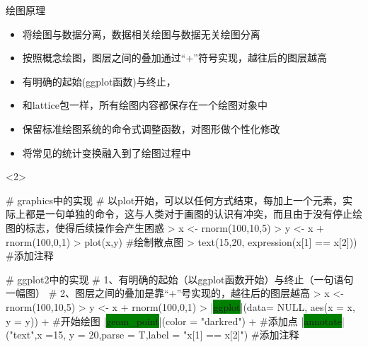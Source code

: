 \begin{frame}[t,fragile]{\subsecname}{绘图原理}
\begin{itemize}
\item<1-> 将绘图与数据分离，数据相关绘图与数据无关绘图分离
\item<2-> 按照概念绘图，图层之间的叠加通过“+”符号实现，越往后的图层越高
\item<2-> 有明确的起始(ggplot函数)与终止，
\item<3-> 和lattice包一样，所有绘图内容都保存在一个绘图对象中
\item<4-> 保留标准绘图系统的命令式调整函数，对图形做个性化修改
\item<4-> 将常见的统计变换融入到了绘图过程中
\end{itemize}

\begin{overlayarea}{\textwidth}{\textheight}
\begin{onlyenv}<2>
\begin{minipage}{\textwidth}
\begin{rcode}
# graphics中的实现
# 以plot开始，可以以任何方式结束，每加上一个元素，实际上都是一句单独的命令，这与人类对于画图的认识有冲突，而且由于没有停止绘图的标志，使得后续操作会产生困惑
> x <- rnorm(100,10,5)
> y <- x + rnorm(100,0,1)
> plot(x,y)   #绘制散点图
> text(15,20, expression(x[1] == x[2])) #添加注释
\end{rcode} 
\end{minipage}

\begin{minipage}{\textwidth}
\begin{rcode}
# ggplot2中的实现
# 1、有明确的起始（以ggplot函数开始）与终止（一句语句一幅图）
# 2、图层之间的叠加是靠“+”号实现的，越往后的图层越高
> x <- rnorm(100,10,5) 
> y <- x + rnorm(100,0,1) 
> |\colorbox{green}{ggplot}|(data= NULL, aes(x = x, y = y)) +  #开始绘图
  |\colorbox{green}{geom\_point}|(color = "darkred") +  #添加点
  |\colorbox{green}{annotate}|("text",x =15, y = 20,parse = T,label = "x[1] == x[2]") #添加注释
\end{rcode}
\end{minipage}
\end{onlyenv}
\end{overlayarea}
\end{frame}

